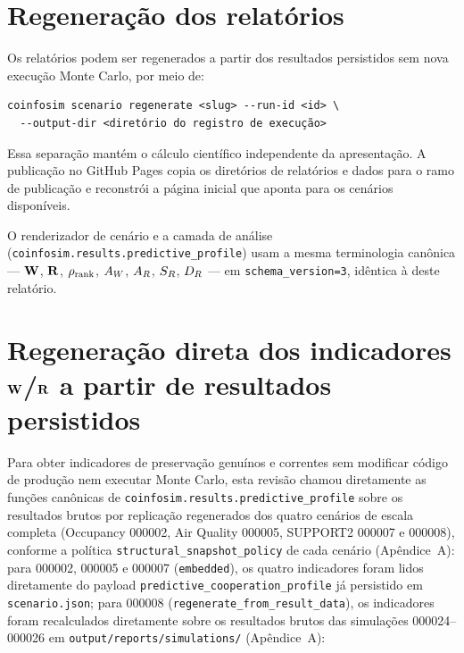 \section{Regeneração dos relatórios}

Os relatórios podem ser regenerados a partir dos resultados persistidos sem nova execução Monte Carlo, por meio de:

\begin{verbatim}
coinfosim scenario regenerate <slug> --run-id <id> \
  --output-dir <diretório do registro de execução>
\end{verbatim}

Essa separação mantém o cálculo científico independente da apresentação. A publicação no GitHub Pages copia os diretórios de relatórios e dados para o ramo de publicação e reconstrói a página inicial que aponta para os cenários disponíveis.

\begin{limitationbox}
O renderizador de cenário e a camada de análise (\texttt{coinfosim.results.predictive\_profile}) usam a mesma terminologia canônica --- $\mathbf{W}$, $\mathbf{R}$, $\rho_{\mathrm{rank}}$, $A_W$, $A_R$, $S_R$, $D_R$ --- em \texttt{schema\_version=3}, idêntica à deste relatório.
\end{limitationbox}

\section{Regeneração direta dos indicadores $\mathbf{W}$/$\mathbf{R}$ a partir de resultados persistidos}
\label{ap:comando-wr}

Para obter indicadores de preservação genuínos e correntes sem modificar código de produção nem executar Monte Carlo, esta revisão chamou diretamente as funções canônicas de \texttt{coinfosim.results.predictive\_profile} sobre os resultados brutos por replicação regenerados dos quatro cenários de escala completa (Occupancy 000002, Air Quality 000005, SUPPORT2 000007 e 000008), conforme a política \texttt{structural\_snapshot\_policy} de cada cenário (Apêndice~A): para 000002, 000005 e 000007 (\texttt{embedded}), os quatro indicadores foram lidos diretamente do payload \texttt{predictive\_cooperation\_profile} já persistido em \texttt{scenario.json}; para 000008 (\texttt{regenerate\_from\_result\_data}), os indicadores foram recalculados diretamente sobre os resultados brutos das simulações 000024--000026 em \texttt{output/reports/simulations/} (Apêndice~A):

